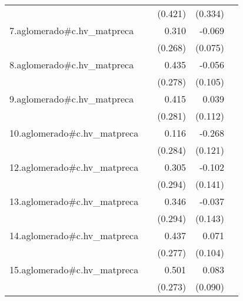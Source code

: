 {\begin{longtable}{l*{4}{D{.}{.}{-1}}}
            &                     &     (0.421)         &     (0.334)         &                     \\
\addlinespace
7.aglomerado#c.hv\_matpreca&                     &       0.310         &      -0.069         &                     \\
            &                     &     (0.268)         &     (0.075)         &                     \\
\addlinespace
8.aglomerado#c.hv\_matpreca&                     &       0.435         &      -0.056         &                     \\
            &                     &     (0.278)         &     (0.105)         &                     \\
\addlinespace
9.aglomerado#c.hv\_matpreca&                     &       0.415         &       0.039         &                     \\
            &                     &     (0.281)         &     (0.112)         &                     \\
\addlinespace
10.aglomerado#c.hv\_matpreca&                     &       0.116         &      -0.268\sym{*}  &                     \\
            &                     &     (0.284)         &     (0.121)         &                     \\
\addlinespace
12.aglomerado#c.hv\_matpreca&                     &       0.305         &      -0.102         &                     \\
            &                     &     (0.294)         &     (0.141)         &                     \\
\addlinespace
13.aglomerado#c.hv\_matpreca&                     &       0.346         &      -0.037         &                     \\
            &                     &     (0.294)         &     (0.143)         &                     \\
\addlinespace
14.aglomerado#c.hv\_matpreca&                     &       0.437         &       0.071         &                     \\
            &                     &     (0.277)         &     (0.104)         &                     \\
\addlinespace
15.aglomerado#c.hv\_matpreca&                     &       0.501         &       0.083         &                     \\
            &                     &     (0.273)         &     (0.090)         &                     \\

\end{longtable}}
